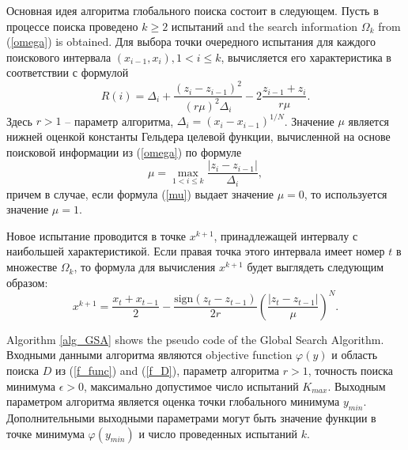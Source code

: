 \documentclass[preprint,12pt]{elsarticle}
\begin{document}
Основная идея алгоритма глобального поиска состоит в следующем.
Пусть в процессе поиска проведено $k \geq 2$ испытаний and the search information $\Omega_k$ from (\ref{omega}) is obtained.
Для выбора точки очередного испытания для каждого поискового интервала $(x_{i-1},x_i), 1<i\leq k$, вычисляется его характеристика в соответствии с формулой
\begin{equation}\label{R}
R(i) = \Delta_i + \frac{(z_i-z_{i-1})^2}{(r\mu)^2\Delta_i}-2\frac{z_{i-1}+z_i}{r\mu}.	
\end{equation}
Здесь $r>1$ -- параметр алгоритма, $\Delta_i=(x_i-x_{i-1})^{1/N}$. Значение $\mu$ является нижней оценкой константы Гельдера целевой функции, вычисленной на основе поисковой информации из (\ref{omega}) по формуле
\begin{equation}\label{mu}
\mu = \max_{1<i\leq k}\frac{\left|z_i-z_{i-1}\right|}{\Delta_i},
\end{equation}
причем в случае, если формула (\ref{mu}) выдает значение $\mu=0$, то используется значение $\mu=1$.

Новое испытание проводится в точке $x^{k+1}$, принадлежащей интервалу с наибольшей характеристикой. Если правая точка этого интервала имеет номер $t$ в множестве $\Omega_k$, то формула для вычисления $x^{k+1}$ будет выглядеть следующим образом:
\begin{equation}\label{xk1}
x^{k+1} = \frac{x_t+x_{t-1}}{2}- \frac{\mathrm{sign}(z_t-z_{t-1})}{2r} \left(\frac{\left|z_t-z_{t-1}\right|}{\mu}\right)^N.   
\end{equation}


Algorithm \ref{alg_GSA} shows the pseudo code of the Global Search Algorithm.
Входными данными алгоритма являются objective function $\varphi(y)$  и область поиска $D$ из (\ref{f_func}) and (\ref{f_D}), параметр алгоритма $r>1$, точность поиска минимума $\epsilon > 0$, максимально допустимое число испытаний $K_{max}$. Выходным параметром алгоритма является оценка точки глобального минимума $y_{min}$. Дополнительными выходными параметрами могут быть значение функции в точке минимума $\varphi(y_{min})$ и число проведенных испытаний $k$.
\end{document}
